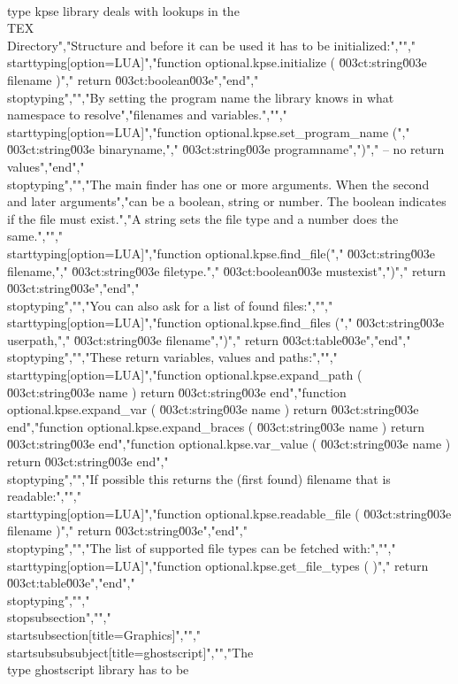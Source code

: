 \\type {kpse} library deals with lookups in the \\TEX\\ Directory","Structure and before it can be used it has to be initialized:","","\\starttyping[option=LUA]","function optional.kpse.initialize ( \u003ct:string\u003e filename )","    return \u003ct:boolean\u003e","end","\\stoptyping","","By setting the program name the library knows in what namespace to resolve","filenames and variables.","","\\starttyping[option=LUA]","function optional.kpse.set_program_name (","    \u003ct:string\u003e binaryname,","    \u003ct:string\u003e programname",")","    -- no return values","end","\\stoptyping","","The main finder has one or more arguments. When the second and later arguments","can be a boolean, string or number. The boolean indicates if the file must exist.","A string sets the file type and a number does the same.","","\\starttyping[option=LUA]","function optional.kpse.find_file(","    \u003ct:string\u003e  filename,","    \u003ct:string\u003e  filetype.","    \u003ct:boolean\u003e mustexist",")","    return \u003ct:string\u003e","end","\\stoptyping","","You can also ask for a list of found files:","","\\starttyping[option=LUA]","function optional.kpse.find_files (","    \u003ct:string\u003e userpath,","    \u003ct:string\u003e filename",")","    return \u003ct:table\u003e","end","\\stoptyping","","These return variables, values and paths:","","\\starttyping[option=LUA]","function optional.kpse.expand_path   ( \u003ct:string\u003e name ) return \u003ct:string\u003e end","function optional.kpse.expand_var    ( \u003ct:string\u003e name ) return \u003ct:string\u003e end","function optional.kpse.expand_braces ( \u003ct:string\u003e name ) return \u003ct:string\u003e end","function optional.kpse.var_value     ( \u003ct:string\u003e name ) return \u003ct:string\u003e end","\\stoptyping","","If possible this returns the (first found) filename that is readable:","","\\starttyping[option=LUA]","function optional.kpse.readable_file ( \u003ct:string\u003e filename )","    return \u003ct:string\u003e","end","\\stoptyping","","The list of supported file types can be fetched with:","","\\starttyping[option=LUA]","function optional.kpse.get_file_types ( )","    return \u003ct:table\u003e","end","\\stoptyping","","\\stopsubsection","","\\startsubsection[title=Graphics]","","\\startsubsubsubject[title=ghostscript]","","The \\type {ghostscript} library has to be 